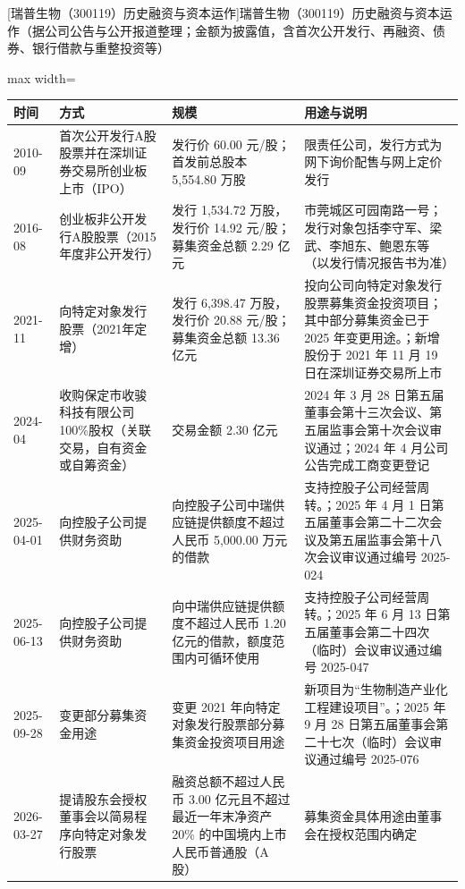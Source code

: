 \begin{center}\small\setlength{\tabcolsep}{4pt}
[瑞普生物（300119）历史融资与资本运作]{瑞普生物（300119）历史融资与资本运作（据公司公告与公开报道整理；金额为披露值，含首次公开发行、再融资、债券、银行借款与重整投资等）}
\begin{adjustbox}{max width=\textwidth}
\begin{tabular}{@{}p{1.45cm}p{2.55cm}p{4.05cm}p{4.95cm}@{}}
\toprule
时间 & 方式 & 规模 & 用途与说明 \\
\midrule
2010-09 & 首次公开发行A股股票并在深圳证券交易所创业板上市（IPO） & 发行价 60.00 元/\allowbreak{}股；首发前总股本 5,\allowbreak{}554.80 万股 & 限责任公司，\allowbreak{}发行方式为网下询价配售与网上定价发行 \\
2016-08 & 创业板非公开发行A股股票（2015年度非公开发行） & 发行 1,\allowbreak{}534.72 万股，\allowbreak{}发行价 14.92 元/\allowbreak{}股；募集资金总额 2.29 亿元 & 市莞城区可园南路一号；发行对象包括李守军、\allowbreak{}梁武、\allowbreak{}李旭东、\allowbreak{}鲍恩东等（以发行情况报告书为准） \\
2021-11 & 向特定对象发行股票（2021年定增） & 发行 6,\allowbreak{}398.47 万股，\allowbreak{}发行价 20.88 元/\allowbreak{}股；募集资金总额 13.36 亿元 & 投向公司向特定对象发行股票募集资金投资项目；其中部分募集资金已于 2025 年变更用途。；新增股份于 2021 年 11 月 19 日在深圳证券交易所上市 \\
2024-04 & 收购保定市收骏科技有限公司100\%股权（关联交易，自有资金或自筹资金） & 交易金额 2.30 亿元 & 2024 年 3 月 28 日第五届董事会第十三次会议、\allowbreak{}第五届监事会第十次会议审议通过；2024 年 4 月公司公告完成工商变更登记 \\
2025-04-01 & 向控股子公司提供财务资助 & 向控股子公司中瑞供应链提供额度不超过人民币 5,\allowbreak{}000.00 万元的借款 & 支持控股子公司经营周转。；2025 年 4 月 1 日第五届董事会第二十二次会议及第五届监事会第十八次会议审议通过编号 2025-024 \\
2025-06-13 & 向控股子公司提供财务资助 & 向中瑞供应链提供额度不超过人民币 1.20 亿元的借款，\allowbreak{}额度范围内可循环使用 & 支持控股子公司经营周转。；2025 年 6 月 13 日第五届董事会第二十四次（临时）会议审议通过编号 2025-047 \\
2025-09-28 & 变更部分募集资金用途 & 变更 2021 年向特定对象发行股票部分募集资金投资项目用途 & 新项目为“生物制造产业化工程建设项目”。；2025 年 9 月 28 日第五届董事会第二十七次（临时）会议审议通过编号 2025-076 \\
2026-03-27 & 提请股东会授权董事会以简易程序向特定对象发行股票 & 融资总额不超过人民币 3.00 亿元且不超过最近一年末净资产 20\% 的中国境内上市人民币普通股（A 股） & 募集资金具体用途由董事会在授权范围内确定 \\
\bottomrule
\end{tabular}
\end{adjustbox}
\end{center}

